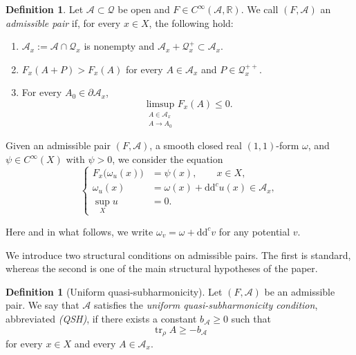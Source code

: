 \documentclass[oneside,english,letterpaper]{amsart}
\numberwithin{equation}{section}
\theoremstyle{plain}
\theoremstyle{definition}
\newtheorem{defn}[thm]{Definition}
\theoremstyle{remark}
\renewcommand{\d}{\mathrm{d}}
\newcommand{\ddc}{\d\d^c}
\def\tr{\operatorname{tr}}
\begin{document}
\begin{defn}
	\label{def:admissible-pair}
	Let $\mathcal A\subset\mathcal Q$ be open and
	$F\in C^\infty(\mathcal A,\mathbb R)$. We call $(F,\mathcal A)$ an
	\emph{admissible pair} if, for every $x\in X$, the following hold:
	\begin{enumerate}[label=\textnormal{(A\arabic*)}, ref=\textnormal{(A\arabic*)}]
		\item\label{admp:A1}
		$\mathcal A_x:=\mathcal A\cap\mathcal Q_x$ is nonempty and
		$\mathcal A_x+\mathcal Q_x^+\subset\mathcal A_x$.
		\item\label{admp:A2}
		$F_x(A+P)>F_x(A)$ for every $A\in\mathcal A_x$ and
		$P\in\mathcal Q_x^{++}$.
		\item\label{admp:A3}
		For every $A_0\in\partial\mathcal A_x$,
		$$
		\limsup_{\substack{A\in\mathcal A_x\\ A\to A_0}}F_x(A)\leq0.
		$$
	\end{enumerate}
\end{defn}

Given an admissible pair $(F,\mathcal A)$, a smooth closed real
$(1,1)$-form $\omega$, and $\psi\in C^\infty(X)$ with $\psi>0$, we
consider the equation
\begin{equation}
	\label{eq:main-equation}
	\left\{
	\begin{aligned}
		F_x\bigl(\omega_u(x)\bigr)&=\psi(x),\qquad x\in X,\\
		\omega_u(x)&=\omega(x)+\ddc u(x)\in\mathcal A_x,\\
		\sup_Xu&=0.
	\end{aligned}
	\right.
\end{equation}

Here and in what follows, we write $\omega_v=\omega+\ddc v$ for any
potential $v$.



We introduce two structural conditions on admissible pairs. The first is
standard, whereas the second is one of the main structural hypotheses of
the paper.

\begin{defn}[Uniform quasi-subharmonicity]
	\label{def:QSH}
	Let $(F,\mathcal A)$ be an admissible pair. We say that $\mathcal A$
	satisfies the \emph{uniform quasi-subharmonicity condition}, abbreviated
	\emph{(QSH)}, if there exists a constant $b_{\mathcal A}\geq0$ such that
	\begin{equation}
		\label{eq:QSH}
		\tr_\rho A\geq -b_{\mathcal A}
	\end{equation}
	for every $x\in X$ and every $A\in\mathcal A_x$.
\end{defn}
\end{document}
